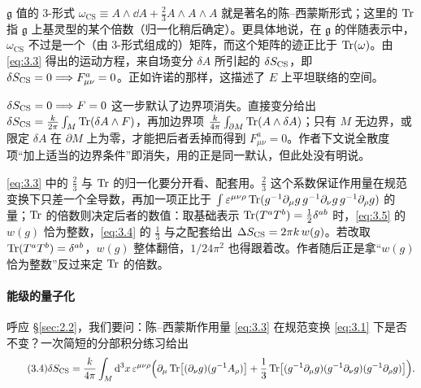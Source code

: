 $\mathfrak{g}$ 值的 3-形式 $\omega_{\mathrm{CS}}\equiv A\wedge\dd A+\frac23 A\wedge A\wedge A$ 就是著名的陈--西蒙斯形式；这里的 $\operatorname{Tr}$ 指 $\mathfrak{g}$ 上基灵型的某个倍数（归一化稍后确定）。更具体地说，在 $\mathfrak{g}$ 的伴随表示中，$\omega_{\mathrm{CS}}$ 不过是一个（由 3-形式组成的）矩阵，而这个矩阵的迹正比于 $\operatorname{Tr}(\omega)$。由 \eqref{eq:3.3} 得出的运动方程，来自场变分 $\delta A$ 所引起的 $\delta S_{\mathrm{CS}}$，即 $\delta S_{\mathrm{CS}}=0\Longrightarrow F^a_{\mu\nu}=0$。正如许诺的那样，这描述了 $E$ 上平坦联络的空间。

\begin{yizhu}[易错点]
$\delta S_{\mathrm{CS}}=0\Longrightarrow F=0$ 这一步默认了边界项消失。直接变分给出 $\delta S_{\mathrm{CS}}=\frac{k}{2\pi}\int_M\operatorname{Tr}(\delta A\wedge F)$，再加边界项 $\frac{k}{4\pi}\int_{\partial M}\operatorname{Tr}(A\wedge\delta A)$；只有 $M$ 无边界，或限定 $\delta A$ 在 $\partial M$ 上为零，才能把后者丢掉而得到 $F^a_{\mu\nu}=0$。作者下文说全散度项“加上适当的边界条件”即消失，用的正是同一默认，但此处没有明说。
\end{yizhu}

\begin{yizhu}[易错点]
\eqref{eq:3.3} 中的 $\frac23$ 与 $\operatorname{Tr}$ 的归一化要分开看、配套用。$\frac23$ 这个系数保证作用量在规范变换下只差一个全导数，再加一项正比于 $\int\varepsilon^{\mu\nu\rho}\operatorname{Tr}(g^{-1}\partial_\mu g\,g^{-1}\partial_\nu g\,g^{-1}\partial_\rho g)$ 的量；$\operatorname{Tr}$ 的倍数则决定后者的数值：取基础表示 $\operatorname{Tr}(T^aT^b)=\frac12\delta^{ab}$ 时，\eqref{eq:3.5} 的 $w(g)$ 恰为整数，\eqref{eq:3.4} 的 $\frac13$ 与之配套给出 $\Delta S_{\mathrm{CS}}=2\pi k\,w(g)$。若改取 $\operatorname{Tr}(T^aT^b)=\delta^{ab}$，$w(g)$ 整体翻倍，$1/24\pi^2$ 也得跟着改。作者随后正是拿“$w(g)$ 恰为整数”反过来定 $\operatorname{Tr}$ 的倍数。
\end{yizhu}

\paragraph{能级的量子化}
呼应 \S\ref{sec:2.2}，我们要问：陈--西蒙斯作用量 \eqref{eq:3.3} 在规范变换 \eqref{eq:3.1} 下是否不变？一次简短的分部积分练习给出
\begin{equation}\tag{3.4}\label{eq:3.4}
  \delta S_{\mathrm{CS}} = \frac{k}{4\pi}\int_M \mathrm{d}^3x\,\varepsilon^{\mu\nu\rho}\Bigl(\partial_\mu\operatorname{Tr}\bigl[(\partial_\nu g)(g^{-1}A_\rho)\bigr] + \frac{1}{3}\operatorname{Tr}\bigl[(g^{-1}\partial_\mu g)(g^{-1}\partial_\nu g)(g^{-1}\partial_\rho g)\bigr]\Bigr).
\end{equation}


